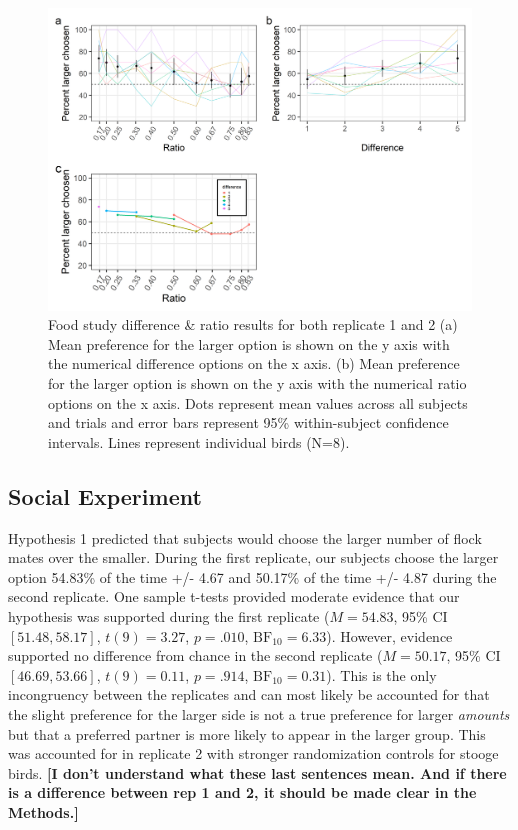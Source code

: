 \documentclass[
  ,doc,floatsintext]{apa6}
\begin{document}
\begin{figure}

{\centering \includegraphics[width=1\linewidth]{../figures/food_figures} 

}

\caption{Food study difference \& ratio results for both replicate 1 and 2 (a) Mean preference for the larger option is shown on the y axis with the numerical difference options on the x axis. (b) Mean preference for the larger option is shown on the y axis with the numerical ratio options on the x axis. Dots represent mean values across all subjects and trials and error bars represent 95\% within-subject confidence intervals. Lines represent individual birds (N=8).}\label{fig:foodgraphs}
\end{figure}

\hypertarget{social-experiment-1}{%
\subsection{Social Experiment}\label{social-experiment-1}}

Hypothesis 1 predicted that subjects would choose the larger number of flock mates over the smaller. During the first replicate, our subjects choose the larger option 54.83\% of the time +/- 4.67 and 50.17\% of the time +/- 4.87 during the second replicate. One sample t-tests provided moderate evidence that our hypothesis was supported during the first replicate (\(M = 54.83\), 95\% CI \([51.48, 58.17]\), \(t(9) = 3.27\), \(p = .010\), \(\mathrm{BF}_{\textrm{10}} = 6.33\)). However, evidence supported no difference from chance in the second replicate (\(M = 50.17\), 95\% CI \([46.69, 53.66]\), \(t(9) = 0.11\), \(p = .914\), \(\mathrm{BF}_{\textrm{10}} = 0.31\)). This is the only incongruency between the replicates and can most likely be accounted for that the slight preference for the larger side is not a true preference for larger \emph{amounts} but that a preferred partner is more likely to appear in the larger group. This was accounted for in replicate 2 with stronger randomization controls for stooge birds. \textbf{{[}I don't understand what these last sentences mean. And if there is a difference between rep 1 and 2, it should be made clear in the Methods.{]}}
\end{document}
